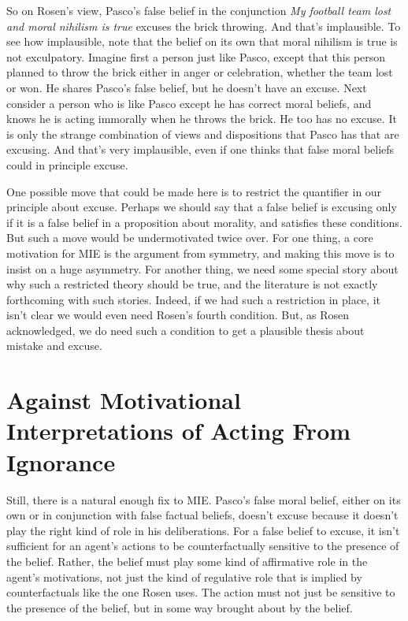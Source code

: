 So on Rosen's view, \gls{Pasco}'s false belief in the conjunction \emph{My football team lost and moral nihilism is true} excuses the brick throwing. And that's implausible. To see how implausible, note that the belief on its own that moral nihilism is true is not exculpatory. Imagine first a person just like \gls{Pasco}, except that this person planned to throw the brick either in anger or celebration, whether the team lost or won. He shares \gls{Pasco}'s false belief, but he doesn't have an excuse. Next consider a person who is like \gls{Pasco} except he has correct moral beliefs, and knows he is acting immorally when he throws the brick. He too has no excuse. It is only the strange combination of views and dispositions that \gls{Pasco} has that are excusing. And that's very implausible, even if one thinks that false moral beliefs could in principle excuse.

One possible move that could be made here is to restrict the quantifier in our principle about excuse. Perhaps we should say that a false belief is excusing only if it is a false belief in a proposition about morality, and satisfies these conditions. But such a move would be undermotivated twice over. For one thing, a core motivation for MIE is the argument from symmetry, and making this move is to insist on a huge asymmetry. For another thing, we need some special story about why such a restricted theory should be true, and the literature is not exactly forthcoming with such stories. Indeed, if we had such a restriction in place, it isn't clear we would even need Rosen's fourth condition. But, as Rosen acknowledged, we do need such a condition to get a plausible thesis about mistake and excuse.

\section{Against Motivational Interpretations of Acting From Ignorance}
\label{againstmotivationalinterpretationsofactingfromignorance}

Still, there is a natural enough fix to MIE. \gls{Pasco}'s false moral belief, either on its own or in conjunction with false factual beliefs, doesn't excuse because it doesn't play the right kind of role in his deliberations. For a false belief to excuse, it isn't sufficient for an agent's actions to be counterfactually sensitive to the presence of the belief. Rather, the belief must play some kind of affirmative role in the agent's motivations, not just the kind of regulative role that is implied by counterfactuals like the one Rosen uses. The action must not just be sensitive to the presence of the belief, but in some way brought about by the belief.

